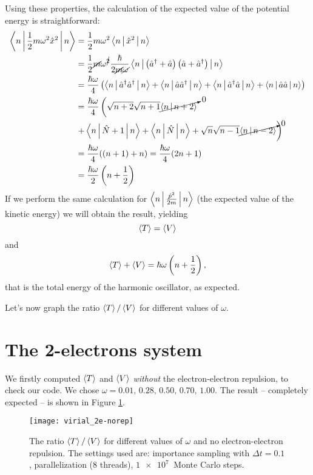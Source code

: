 Using these properties, the calculation of the expected value of the potential energy is straightforward:
\begin{align}
	\Braket{n|\frac{1}{2}m\omega^2\hat{x}^2|n}
	&= \frac{1}{2}m\omega^2\Braket{n|\hat{x}^2|n} \\
	&= \frac{1}{2}\cancel{m}\omega^{\cancel{2}}\frac{\hbar}{2\cancel{m}\cancel{\omega}}\Braket{n|\left(\hat{a}^{\dagger}+\hat{a}\right)\left(\hat{a}+\hat{a}^{\dagger}\right)|n} \\
	&= \frac{\hbar\omega}{4} \left(\Braket{n|\hat{a}^{\dagger}\hat{a}^{\dagger}|n}+\Braket{n|\hat{a}\hat{a}^{\dagger}|n}+\Braket{n|\hat{a}^{\dagger}\hat{a}|n}+\Braket{n|\hat{a}\hat{a}|n}\right) \\
	&= \frac{\hbar\omega}{4} \left(\sqrt{n+2}\sqrt{n+1}\cancelto{0}{\Braket{n|n+2}}\right. \\
	&\left.+\Braket{n|\hat{N}+1|n}+\Braket{n|\hat{N}|n}+\sqrt{n}\sqrt{n-1}\cancelto{0}{\Braket{n|n-2}}\right) \\
	&= \frac{\hbar\omega}{4}((n+1)+n) = \frac{\hbar\omega}{4}(2n+1) \\
	&= \frac{\hbar\omega}{2}\left(n+\frac{1}{2}\right)
\end{align}
If we perform the same calculation for $\Braket{n|\frac{\hat{p}^2}{2m}|n}$ (the expected value of the kinetic energy) we will obtain the result, yielding
\begin{equation}
	\Braket{T} = \Braket{V}
\end{equation}
and
\begin{equation}
	\Braket{T}+\Braket{V} = \hbar\omega\left(n+\frac{1}{2}\right),
\end{equation}
that is the total energy of the harmonic oscillator, as expected.

Let's now graph the ratio $\Braket{T} / \Braket{V}$ for different values of $\omega$.

\section{The 2-electrons system}

We firstly computed $\Braket{T}$ and $\Braket{V}$ \emph{without} the electron-electron repulsion, to check our code. We chose $\omega=0.01,\,0.28,\,0.50,\,0.70,\,1.00$. The result -- completely expected -- is shown in Figure \ref{fig:virial_2e-norep}.
\begin{figure}[h]%
	\centering
	\texttt{[image: virial\_2e-norep]}
	\caption{The ratio $\Braket{T} / \Braket{V}$ for different values of $\omega$ and no electron-electron repulsion. The settings used are: importance sampling with $\Delta t = 0.1$, parallelization (8 threads), $\SI{1e7}{}$ Monte Carlo steps.}
	\label{fig:virial_2e-norep}
\end{figure}

